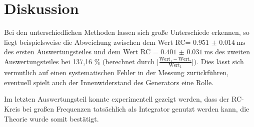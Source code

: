 \section{Diskussion}
\label{sec:Diskussion}
Bei den unterschiedlichen Methoden lassen sich große Unterschiede erkennen, so
liegt beispielsweise die Abweichung zwischen dem Wert RC=
$ \SI{0.951(14)}{\milli\second} $ des ersten Auswertungsteiles und dem Wert
RC = $ \SI{0.401(31)}{\milli\second} $ des zweiten Auswertungsteiles bei 137,16
\% (berechnet durch $\lvert\frac{\text{Wert}_1-\text{Wert}_2}{\text{Wert}_1}\rvert)$.
Dies lässt sich vermutlich auf einen systematischen Fehler in der Messung zurückführen,
eventuell spielt auch der Innenwiderstand des Generators eine Rolle.

\noindent Im letzten Auswertungsteil konnte experimentell gezeigt werden, dass der RC-Kreis
bei großen Frequenzen tatsächlich als Integrator genutzt werden kann, die Theorie
wurde somit bestätigt.
